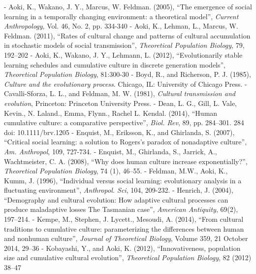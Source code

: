 \documentclass[a4paper, dvipdfmx]{article}
\begin{document}
\vspace{20pt}

\begin{flushleft}
\begin{thebibliography}{1}
\makeatletter
\def\@biblabel#1{}
\let\old@bibitem\bibitem
\def\bibitem#1{\old@bibitem{#1}\leavevmode\kern-\bibindent}
\makeatother
{} Aoki, K., Wakano, J. Y., Marcus, W. Feldman. (2005), ``The emergence of social learning in a temporally changing environment: a theoretical model'', {\it Current Anthropology}, Vol. 46, No. 2, pp. 334-340
 Aoki, K., Lehman, L., Marcus, W. Feldman. (2011), ``Rates of cultural change and patterns of cultural accumulation in stochastic models of social transmission'', {\it Theoretical Population Biology}, 79, 192–202
 Aoki, K., Wakano, J. Y., Lehmann, L. (2012), ``Evolutionarily stable learning schedules and cumulative culture in discrete generation models'', {\it Theoretical Population Biology}, 81:300-30
 Boyd, R., and Richerson, P. J. (1985), {\it Culture and the evolutionary process}. Chicago, IL: University of Chicago Press.
 Cavalli-Sforza, L. L., and Feldman, M. W. (1981), {\it Cultural transmission and evolution}, Princeton: Princeton University Press.
 Dean, L. G., Gill, L. Vale, Kevin., N. Laland., Emma, Flynn., Rachel L. Kendal. (2014), ``Human cumulative culture: a comparative perspective'', {\it Biol. Rev}, 89, pp. 284–301. 284 doi: 10.1111/brv.1205
 Enquist, M., Eriksson, K., and Ghirlanda, S. (2007), ``Critical social learning: a solution to Rogers’s paradox of nonadaptive culture'', {\it Am. Anthropol}, 109, 727-734.
 Enquist, M., Ghirlanda, S., Jarrick, A., Wachtmeister, C. A. (2008), ``Why does human culture increase exponentially?'', {\it Theoretical Population Biology}, 74 (1), 46–55.
 Feldman, M.W., Aoki, K., Kumm, J. (1996), ``Individual versus social learning: evolutionary analysis in a fluctuating environment'', {\it Anthropol. Sci}, 104, 209-232.
 Henrich, J. (2004), ``Demography and cultural evolution: How adaptive cultural processes can produce maladaptive losses The Tasmanian case'', {\it American Antiquity}, 69(2), 197–214.
 Kempe, M., Stephen, J. Lycett., Mesoudi, A. (2014), ``From cultural traditions to cumulative culture: parameterizing the differences between human and nonhuman culture'', {\it Journal of Theoretical Biology}, Volume 359, 21 October 2014, 29–36
 Kobayashi, Y., and Aoki, K. (2012), ``Innovativeness, population size and cumulative cultural evolution'', {\it Theoretical Population Biology}, 82 (2012) 38–47

\end{thebibliography}
\end{flushleft}
\end{document}
